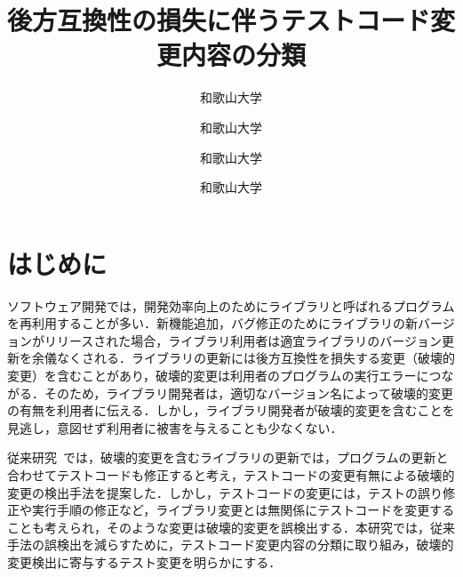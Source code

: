 \documentclass[uplatex,dvipdfmx,a4paper,twocolumn,base=11pt,jbase=11pt,ja=standard]{bxjsarticle}  %
\title{後方互換性の損失に伴うテストコード変更内容の分類}{A classification of test code changes accompanied by a lack of backward compatibility}
\author{和歌山大学}{前川　大樹}{Daiki Maekawa, Wakayama University}
\author{和歌山大学}{伊原　彰紀}{Akinori Ihara, Wakayama University}
\author{和歌山大学}{大森　楓己}{Fuki Omori, Wakayama University}
\author{和歌山大学}{才木　一也}{Kazuya Saiki, Wakayama University}
\begin{document}
\maketitle

\section{はじめに}

ソフトウェア開発では，開発効率向上のためにライブラリと呼ばれるプログラムを再利用することが多い．新機能追加，バグ修正のためにライブラリの新バージョンがリリースされた場合，ライブラリ利用者は適宜ライブラリのバージョン更新を余儀なくされる．ライブラリの更新には後方互換性を損失する変更（破壊的変更）を含むことがあり，破壊的変更は利用者のプログラムの実行エラーにつながる．そのため，ライブラリ開発者は，適切なバージョン名によって破壊的変更の有無を利用者に伝える．しかし，ライブラリ開発者が破壊的変更を含むことを見逃し，意図せず利用者に被害を与えることも少なくない．


従来研究~\cite{FOSE2021_Matsuda}では，破壊的変更を含むライブラリの更新では，プログラムの更新と合わせてテストコードも修正すると考え，テストコードの変更有無による破壊的変更の検出手法を提案した．しかし，テストコードの変更には，テストの誤り修正や実行手順の修正など，ライブラリ変更とは無関係にテストコードを変更することも考えられ，そのような変更は破壊的変更を誤検出する．本研究では，従来手法の誤検出を減らすために，テストコード変更内容の分類に取り組み，破壊的変更検出に寄与するテスト変更を明らかにする．
\end{document}
